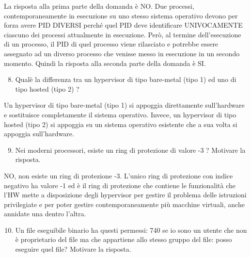 \documentclass[
]{article}
\providecommand{\tightlist}{%
  \setlength{\itemsep}{0pt}\setlength{\parskip}{0pt}}
\begin{document}
{}

{La risposta alla prima parte della domanda è NO. Due processi,
contemporaneamente in esecuzione su uno stesso sistema operativo devono
per forza avere PID DIVERSI perché quel PID deve identificare
UNIVOCAMENTE ciascuno dei processi attualmente in esecuzione. Però, al
termine dell'esecuzione di un processo, il PID di quel processo viene
rilasciato e potrebbe essere assegnato ad un diverso processo che
venisse messo in esecuzione in un secondo momento. Quindi la risposta
alla seconda parte della domanda è SI. }

{}

{}

\begin{enumerate}
\setcounter{enumi}{7}
\tightlist
\item
  {Qual\textquotesingle è la differenza tra un hypervisor di tipo
  bare-metal (tipo 1) ed uno di tipo hosted (tipo 2) ? }
\end{enumerate}

{}

{Un hypervisor di tipo bare-metal (tipo 1) si appoggia direttamente
sull'hardware e sostituisce completamente il sistema operativo. Invece,
un hypervisor di tipo hosted (tipo 2) si appoggia su un sistema
operativo esistente che a sua volta si appoggia sull'hardware.}

{}

{}

\begin{enumerate}
\setcounter{enumi}{8}
\tightlist
\item
  {Nei moderni processori, esiste un ring di protezione di valore -3 ?
  Motivare la risposta. }
\end{enumerate}

{}

{NO, non esiste un ring di protezione -3. L'unico ring di protezione con
indice negativo ha valore -1 ed è il ring di protezione che contiene le
funzionalità che l'HW mette a disposizione degli hypervisor per gestire
il problema delle istruzioni privilegiate e per poter gestire
contemporaneamente più macchine virtuali, anche annidate una dentro
l'altra. }

{}

{}

\begin{enumerate}
\setcounter{enumi}{9}
\tightlist
\item
  {Un file eseguibile binario ha questi permessi: 740 se io sono un
  utente che non è proprietario del file ma che appartiene allo stesso
  gruppo del file: posso eseguire quel file? Motivare la risposta. }
\end{enumerate}
\end{document}
